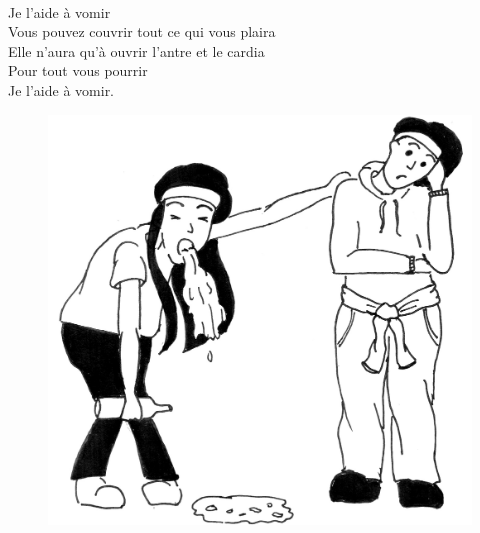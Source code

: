 \\Je l'aide à vomir
\\Vous pouvez couvrir tout ce qui vous plaira
\\Elle n'aura qu'à ouvrir l'antre et le cardia
\\Pour tout vous pourrir \bissimple
\\Je l'aide à vomir.
\\
\begin{figure}[h!]
\centering
   \includegraphics[width=1\textwidth]{images/aide_a_vomir.jpg}
 \end{figure}

\breakpage